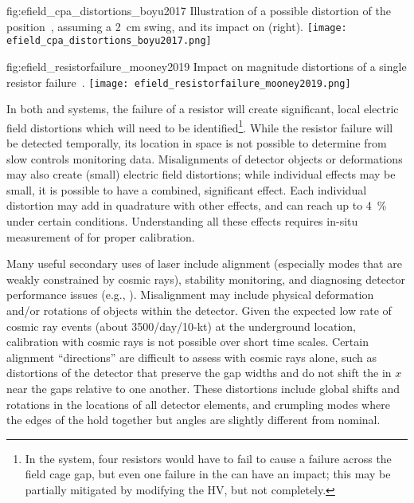 \begin{dunefigure}{fig:efield_cpa_distortions_boyu2017}
{Illustration of a possible distortion of the  position~\cite{bib:yu2017a}, assuming a \SI{2}{\cm} swing, and its impact on \efield (right).}
\texttt{[image: efield\_cpa\_distortions\_boyu2017.png]}
\end{dunefigure}

\begin{dunefigure}{fig:efield_resistorfailure_mooney2019}
{Impact on \efield magnitude distortions of a single  resistor failure~\cite{bib:mooney2019a}.}
\texttt{[image: efield\_resistorfailure\_mooney2019.png]}
\end{dunefigure}

In both \single and \dual systems, the failure of a resistor will create significant, local electric field distortions which will need to be identified\footnote{In the \dual system, four resistors would have to fail to cause a failure across the field cage gap, but even one failure in the  can have an impact; this may be partially mitigated by modifying the HV, but not completely.}. While the resistor failure will be detected temporally, its location in space is not possible to determine from slow controls monitoring data. Misalignments of detector objects or deformations may also create (small) electric field distortions; while individual effects may be small, it is possible to have a combined, significant effect.
Each individual \efield distortion may add in quadrature with other effects, and can reach up to \SI{4}{\%} under certain conditions. Understanding all these effects requires in-situ measurement of \efield for proper calibration. 

Many useful secondary uses of laser include alignment (especially modes that are weakly constrained by cosmic rays),
stability monitoring, and diagnosing detector performance issues
(e.g., ).  
Misalignment may include physical deformation and/or rotations of objects within the detector. Given the expected low rate of cosmic ray events (about 3500/day/10-kt) at the underground location, calibration with cosmic rays is not possible over short time scales. Certain alignment ``directions''  are difficult to assess with cosmic rays alone, such as distortions of the detector that preserve the gap widths and do not shift the  in $x$ near the gaps relative to one another.
These distortions include global shifts and rotations in the locations of all detector elements, and crumpling modes where the edges of the  hold together but angles are slightly different from nominal.   

